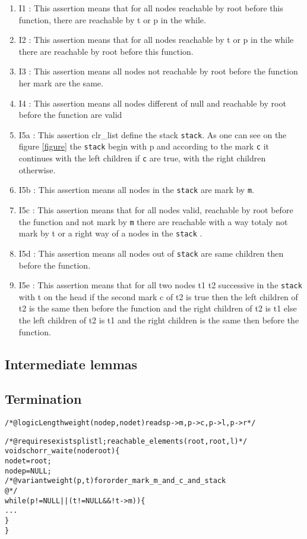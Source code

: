 \begin {enumerate}
\item {I1} : This assertion means that for all nodes reachable by root
  before this function, there are reachable by t or p in the while.
\item {I2} : This assertion means that for all nodes reachable by t or
  p in the while there are reachable by root before this function.
\item {I3} : This assertion means all nodes not reachable by root before the
  function her mark are the same.
\item {I4} :  This assertion means all nodes different of null and
  reachable by root before the function are valid
\item {I5a} : This assertion clr\_list define the stack
  \texttt{stack}. As one can see on the figure \ref{figure} the
  \texttt{stack} begin with p and according to the mark \texttt{c} it
  continues with the left children if \texttt{c} are true, with the
  right children otherwise. 
\item {I5b} : This assertion means all nodes in the
  \texttt{stack} are mark by \texttt{m}.
\item {I5c} : This assertion means that for all nodes valid, reachable by root
  before the function and not mark by \texttt{m} there are reachable with a way
  totaly not mark by t or a right way of a nodes in the \texttt{stack} .
\item {I5d} : This assertion means all nodes out of \texttt{stack} are
  same children then before the function. 
\item {I5e} : This assertion means that for all two nodes t1 t2 successive in
  the \texttt{stack} with t on the head if the second mark c of t2 is
  true then the left children of t2 is the same then before the
  function and the right children of t2 is t1 else the left children
  of t2 is t1 and the right children  is the same then before the
  function.

\end{enumerate}
\subsection{Intermediate lemmas}

\subsection{Termination}

\begin{alltt}
/*@ logic Length weight(node p , node t) reads p->m,p->c,p->l,p->r*/

/*@ requires \bs{}exists plist l; reachable_elements(root,root,l) */
void schorr_waite(node root) \{
  node t = root;
  node p = NULL;
  /*@variant weight(p,t) for order_mark_m_and_c_and_stack 
    @*/
  while (p != NULL || (t != NULL && ! t->m)) \{
   ...
  \}
\}
\end{alltt}

